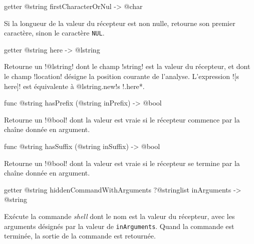 
\begin{galgas4box}
getter @string firstCharacterOrNul -> @char
\end{galgas4box}

Si la longueur de la valeur du récepteur est non nulle, retourne son premier caractère, sinon le caractère \texttt{NUL}.








\begin{galgas4box}
getter @string here -> @lstring
\end{galgas4box}

Retourne un \ggsq!@lstring! dont le champ \ggsq!string! est la valeur du récepteur, et dont le champ \ggsq!location! désigne la position courante de l'analyse. L'expression \ggsq![s here]! est équivalente à \ggsq*@lstring.new{!s !.here}*.









\begin{galgas4box}
func @string hasPrefix (@string inPrefix) -> @bool
\end{galgas4box}

Retourne un \ggsq!@bool! dont la valeur est vraie si le récepteur commence par la chaîne donnée en argument.









\begin{galgas4box}
func @string hasSuffix (@string inSuffix) -> @bool
\end{galgas4box}

Retourne un \ggsq!@bool! dont la valeur est vraie si le récepteur se termine par la chaîne donnée en argument.













\begin{galgas4box}
getter @string hiddenCommandWithArguments ?@stringlist inArguments -> @string
\end{galgas4box}
Exécute la commande \emph{shell} dont le nom est la valeur du récepteur, avec les arguments désignés par la valeur de \texttt{inArguments}. Quand la commande est terminée, la sortie de la commande est retournée.

